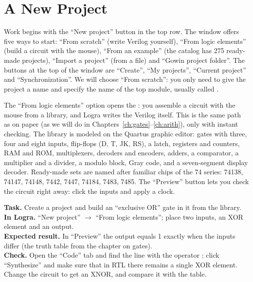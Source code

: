 \section{A New Project}

Work begins with the ``New project'' button in the top row. The window
offers five ways to start: ``From scratch'' (write Verilog yourself),
``From logic elements'' (build a circuit with the mouse), ``From an example'' (the
catalog has 275 ready-made projects), ``Import a project'' (from a file) and ``Gowin project
folder''. The buttons at the top of the window are ``Create'', ``My projects'', ``Current project''
and ``Synchronization''. We will choose ``From scratch'': you only need to give the project a name and
specify the name of the top module, usually called .


The ``From logic elements'' option opens the : you assemble a circuit
with the mouse from a library, and Logra writes the Verilog itself. This is the same path as
on paper (as we will do in Chapters~\ref{ch:gates}--\ref{ch:arith}), only with
instant checking. The library is modeled on
the Quartus graphic editor: gates with three, four and eight
inputs, flip-flops (D, T, JK, RS), a latch, registers and counters, RAM and ROM,
multiplexers, decoders and encoders, adders, a comparator, a multiplier and
a divider, a modulo block, Gray code, and a seven-segment display decoder.
Ready-made sets are named after familiar chips of the 74 series: 74138, 74147,
74148, 7442, 7447, 74184, 7483, 7485. The ``Preview'' button lets you check
the circuit right away: click the inputs and apply a clock.

\begin{diybox}
\textbf{Task.} Create a project and build an ``exclusive OR'' gate in it from the
library.\\
\textbf{In Logra.} ``New project'' $\to$ ``From logic elements''; place
two inputs, an XOR element and an output.\\
\textbf{Expected result.} In ``Preview'' the output equals 1 exactly when the
inputs differ (the truth table from the chapter on gates).\\
\textbf{Check.} Open the ``Code'' tab and find the  line with
the operator \code{\^{}}; click ``Synthesize'' and make sure that in RTL there remains
a single XOR element.\\
 Change the circuit to get an XNOR, and compare it with the table.
\end{diybox}

